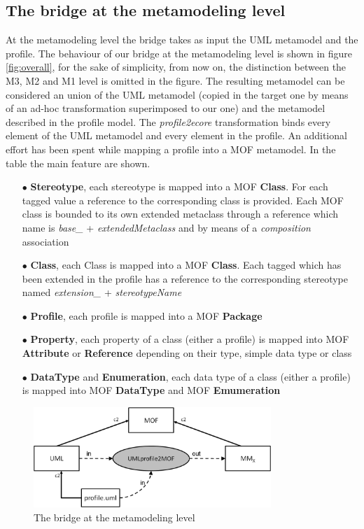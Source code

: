 \subsection{The bridge at the metamodeling level}\label{sec:metamodelLevel}
At the metamodeling level the bridge takes as input the UML metamodel and the profile. The behaviour of our bridge at the metamodeling level is shown in figure \ref{fig:overall}, for the sake of simplicity, from now on, the distinction between the M3, M2 and M1 level is omitted in the figure. The resulting metamodel can be considered an union of the UML metamodel (copied in the target one by means of an ad-hoc transformation superimposed to our one) and the metamodel described in the profile model. The \textit{profile2ecore} transformation binds every element of the UML metamodel and every element in the profile. An additional effort has been spent while mapping a profile into a MOF metamodel. In the table the main feature are shown.
\begin{itemize}
	\item[$\bullet$] \textbf{Stereotype}, each stereotype is mapped into a MOF \textbf{Class}. For each tagged value a reference to the corresponding class is provided. Each MOF class is bounded to its own extended metaclass through a reference which name is \textit{base\_} + \textit{extendedMetaclass} and by means of a \textit{composition} association
	\item[$\bullet$] \textbf{Class}, each Class is mapped into a MOF \textbf{Class}. Each tagged which has been extended in the profile has a reference to the corresponding stereotype named  \textit{extension\_} + \textit{stereotypeName}
	\item[$\bullet$] \textbf{Profile}, each profile is mapped into a MOF \textbf{Package}
	\item[$\bullet$] \textbf{Property}, each property of a class (either a profile) is mapped into MOF \textbf{Attribute} or \textbf{Reference} depending on their type, simple data type or class
	\item[$\bullet$] \textbf{DataType} and \textbf{Enumeration}, each data type of a class (either a profile) is mapped into MOF \textbf{DataType} and MOF \textbf{Emumeration}
\end{itemize}
%
\begin{figure}[htbp]
	\centering
		\includegraphics[width=0.80\textwidth]{figures/metamodelingLevel.png}
	\caption{The bridge at the metamodeling level}
	\label{fig:metamodelingLevel}
\end{figure}
